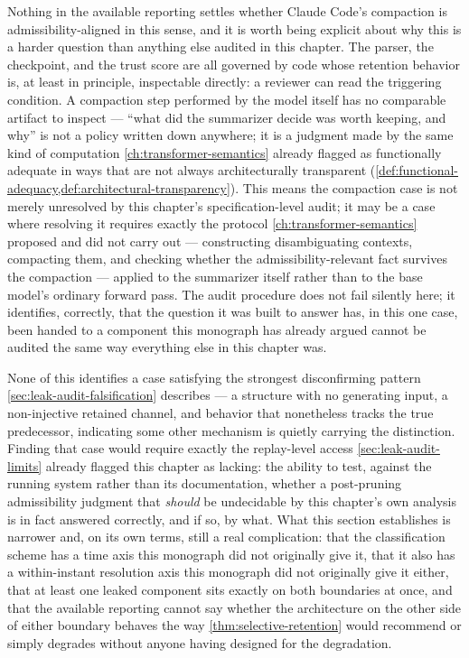 \documentclass[11pt]{book}
\theoremstyle{plain}
\theoremstyle{definition}
\theoremstyle{remark}
\begin{document}
Nothing in the available reporting settles whether Claude Code's
compaction is admissibility-aligned in this sense, and it is worth
being explicit about why this is a harder question than anything else
audited in this chapter. The parser, the checkpoint, and the trust
score are all governed by code whose retention behavior is, at least
in principle, inspectable directly: a reviewer can read the triggering
condition. A compaction step performed by the model itself has no
comparable artifact to inspect --- \enquote{what did the summarizer
decide was worth keeping, and why} is not a policy written down
anywhere; it is a judgment made by the same kind of computation
\cref{ch:transformer-semantics} already flagged as functionally
adequate in ways that are not always architecturally transparent
(\cref{def:functional-adequacy,def:architectural-transparency}). This
means the compaction case is not merely unresolved by this chapter's
specification-level audit; it may be a case where resolving it
requires exactly the protocol \cref{ch:transformer-semantics} proposed
and did not carry out --- constructing disambiguating contexts,
compacting them, and checking whether the admissibility-relevant fact
survives the compaction --- applied to the summarizer itself rather
than to the base model's ordinary forward pass. The audit procedure
does not fail silently here; it identifies, correctly, that the
question it was built to answer has, in this one case, been handed to
a component this monograph has already argued cannot be audited the
same way everything else in this chapter was.

None of this identifies a case satisfying the strongest disconfirming
pattern \cref{sec:leak-audit-falsification} describes --- a structure
with no generating input, a non-injective retained channel, and
behavior that nonetheless tracks the true predecessor, indicating some
other mechanism is quietly carrying the distinction. Finding that case
would require exactly the replay-level access
\cref{sec:leak-audit-limits} already flagged this chapter as lacking:
the ability to test, against the running system rather than its
documentation, whether a post-pruning admissibility judgment that
\emph{should} be undecidable by this chapter's own analysis is in fact
answered correctly, and if so, by what. What this section establishes
is narrower and, on its own terms, still a real complication: that
the classification scheme has a time axis this monograph did not
originally give it, that it also has a within-instant resolution axis
this monograph did not originally give it either, that at least one
leaked component sits exactly on both boundaries at once, and that the
available reporting cannot say whether the architecture on the other
side of either boundary behaves the way \cref{thm:selective-retention}
would recommend or simply degrades without anyone having designed for
the degradation.
\end{document}
